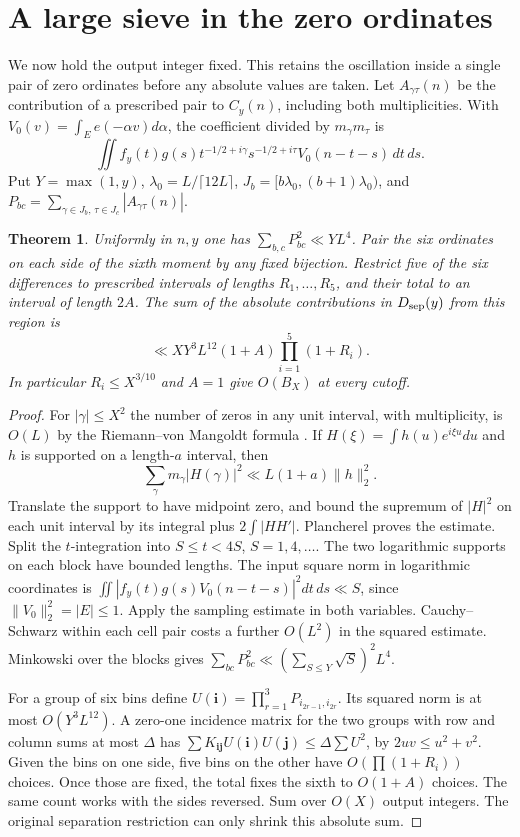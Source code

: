 \documentclass[11pt,a4paper]{article}
\newtheorem{theorem}{Theorem}[section]\newtheorem{prop}[theorem]{Proposition}
\begin{document}
\section{A large sieve in the zero ordinates}\label{s:heights}
We now hold the output integer fixed. This retains the oscillation inside a single pair of zero ordinates before any absolute values are taken. Let \(A_{\gamma\tau}(n)\) be the contribution of a prescribed pair to \(C_y(n)\), including both multiplicities. With \(V_0(v)=\int_E e(-\alpha v)d\alpha\), the coefficient divided by \(m_\gamma m_\tau\) is
\[
 \iint f_y(t)g(s)t^{-1/2+i\gamma}s^{-1/2+i\tau}V_0(n-t-s)\,dt\,ds .
\]
Put \(Y=\max(1,y)\), \(\lambda_0=L/\lceil12L\rceil\), \(J_b=[b\lambda_0,(b+1)\lambda_0)\), and \(P_{bc}=\sum_{\gamma\in J_b,\,\tau\in J_c}|A_{\gamma\tau}(n)|\).
\begin{theorem}\label{t:cells}
Uniformly in \(n,y\) one has \(\sum_{b,c}P_{bc}^2\ll YL^4\). Pair the six ordinates on each side of the sixth moment by any fixed bijection. Restrict five of the six differences to prescribed intervals of lengths \(R_1,\ldots,R_5\), and their total to an interval of length \(2A\). The sum of the absolute contributions in \(D_{{\mathrm{sep}}}(y)\) from this region is
\[
 \ll XY^3 L^{12}(1+A)\prod_{i=1}^5(1+R_i).
\]
In particular \(R_i\le X^{3/10}\) and \(A=1\) give \(O(B_X)\) at every cutoff.
\end{theorem}
\begin{proof}
For \(|\gamma|\le X^2\) the number of zeros in any unit interval, with multiplicity, is \(O(L)\) by the Riemann--von Mangoldt formula \cite{Ch}. If \(H(\xi)=\int h(u)e^{i\xi u}du\) and \(h\) is supported on a length-\(a\) interval, then
\[
 \sum_\gamma m_\gamma|H(\gamma)|^2\ll L(1+a)\|h\|_2^2 .
\]
Translate the support to have midpoint zero, and bound the supremum of \(|H|^2\) on each unit interval by its integral plus \(2\int|HH'|\). Plancherel proves the estimate. Split the \(t\)-integration into \(S\le t<4S\), \(S=1,4,\ldots\). The two logarithmic supports on each block have bounded lengths. The input square norm in logarithmic coordinates is
\(\iint|f_y(t)g(s)V_0(n-t-s)|^2dt\,ds\ll S\), since \(\|V_0\|_2^2=|E|\le1\). Apply the sampling estimate in both variables. Cauchy--Schwarz within each cell pair costs a further \(O(L^2)\) in the squared estimate. Minkowski over the blocks gives \(\sum_{bc}P_{bc}^2\ll(\sum_{S\le Y}\sqrt S)^2L^4\).

For a group of six bins define \(U(\mathbf i)=\prod_{r=1}^3P_{i_{2r-1},i_{2r}}\). Its squared norm is at most \(O(Y^3L^{12})\). A zero-one incidence matrix for the two groups with row and column sums at most \(\Delta\) has \(\sum K_{\mathbf i\mathbf j}U(\mathbf i)U(\mathbf j)\le\Delta\sum U^2\), by \(2uv\le u^2+v^2\). Given the bins on one side, five bins on the other have \(O(\prod(1+R_i))\) choices. Once those are fixed, the total fixes the sixth to \(O(1+A)\) choices. The same count works with the sides reversed. Sum over \(O(X)\) output integers. The original separation restriction can only shrink this absolute sum.
\end{proof}
\end{document}
